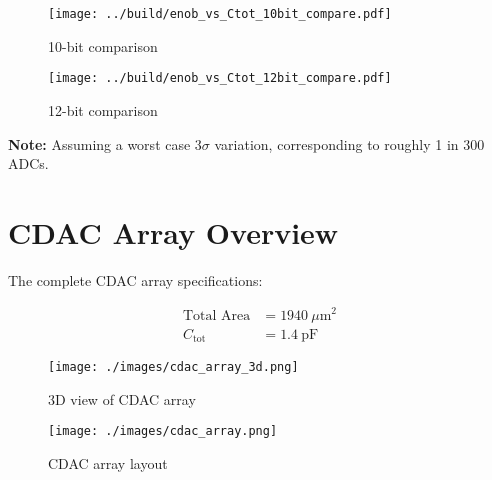 \documentclass[11pt]{article}
\begin{document}
\begin{figure}[htbp]
  \centering
  \begin{minipage}{0.48\textwidth}
    \centering
    \texttt{[image: ../build/enob\_vs\_Ctot\_10bit\_compare.pdf]}
    \caption{10-bit comparison}
  \end{minipage}
  \hfill
  \begin{minipage}{0.48\textwidth}
    \centering
    \texttt{[image: ../build/enob\_vs\_Ctot\_12bit\_compare.pdf]}
    \caption{12-bit comparison}
  \end{minipage}
\end{figure}

\textbf{Note:} Assuming a worst case $3\sigma$ variation, corresponding to roughly 1 in 300 ADCs.

\section{CDAC Array Overview}

The complete CDAC array specifications:

\begin{align}
\text{Total Area} &= 1940~\mu\mathrm{m}^2 \\
C_\mathrm{tot} &= 1.4~\mathrm{pF}
\end{align}

\begin{figure}[htbp]
  \centering
  \begin{minipage}{0.48\textwidth}
    \centering
    \texttt{[image: ./images/cdac\_array\_3d.png]}
    \caption{3D view of CDAC array}
  \end{minipage}
  \hfill
  \begin{minipage}{0.48\textwidth}
    \centering
    \texttt{[image: ./images/cdac\_array.png]}
    \caption{CDAC array layout}
  \end{minipage}
\end{figure}
\end{document}
